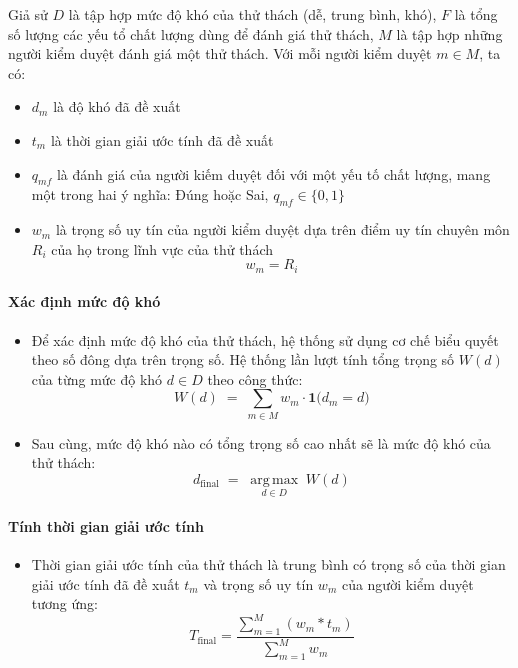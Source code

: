 Giả sử $D$ là tập hợp mức độ khó của thử thách (dễ, trung bình, khó), $F$ là tổng số lượng các yếu tổ chất lượng dùng để đánh giá thử thách, $M$ là tập hợp những người kiểm duyệt đánh giá một thử thách. Với mỗi người kiểm duyệt $m \in M$, ta có:
\begin{itemize}
  \item $d_m$ là độ khó đã đề xuất
  \item $t_m$ là thời gian giải ước tính đã đề xuất
  \item $q_{mf}$ là đánh giá của người kiếm duyệt đối với một yếu tố chất lượng, mang một trong hai ý nghĩa: Đúng hoặc Sai, $q_{mf} \in \{0,1\}$
  \item $w_m$ là trọng số uy tín của người kiểm duyệt dựa trên điểm uy tín chuyên môn $R_{i}$ của họ trong lĩnh vực của thử thách
  \[w_m = R_{i}\]
\end{itemize}

\paragraph{Xác định mức độ khó}
\begin{itemize}
  \item Để xác định mức độ khó của thử thách, hệ thống sử dụng cơ chế biểu quyết theo số đông dựa trên trọng số. Hệ thống lần lượt tính tổng trọng số $W(d)$ của từng mức độ khó $d \in D$ theo công thức:
    \[W(d) \;=\; \sum_{m \in M} w_m \cdot \mathbf{1}\big(d_m = d\big)\]
  \item Sau cùng, mức độ khó nào có tổng trọng số cao nhất sẽ là mức độ khó của thử thách:
    \[d_{\text{final}} \;=\; \underset{d \in D}{\operatorname{arg\,max}}\; W(d)\]
\end{itemize}

\paragraph{Tính thời gian giải ước tính}
\begin{itemize}
  \item Thời gian giải ước tính của thử thách là trung bình có trọng số của thời gian giải ước tính đã đề xuất $t_{m}$ và trọng số uy tín $w_m$ của người kiểm duyệt tương ứng:
    \[T_{\text{final}}= \frac{\displaystyle\sum_{m=1}^{M} (w_{m}*t_{m})}{\displaystyle\sum_{m=1}^{M} w_{m}}\]
\end{itemize}

